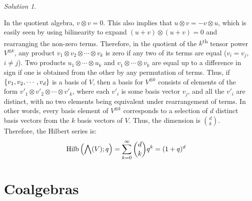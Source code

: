\documentclass[svgnames]{article}
\theoremstyle{definition}
\theoremstyle{remark}
\newtheorem*{Solution*}{Solution}
\theoremstyle{underline}
\theoremstyle{underline}
\DeclareMathOperator{\Hilb}{Hilb}
\renewcommand{\th}{\textsuperscript{th}\xspace}
\begin{document}
\begin{Solution*}
\begin{subquests}
			\item In the quotient algebra, $v \otimes v = 0$. This also implies that $u \otimes v = - v \otimes u$, which is easily seen by using bilinearity to expand $(u + v) \otimes (u + v) = 0$ and rearranging the non-zero terms. Therefore, in the quotient of the $k$\th tensor power $V^{\otimes k}$, any product $v_1 \otimes v_2 \otimes \cdots \otimes v_k$ is zero if any two of its terms are equal ($v_i = v_j$, $i \ne j$). Two products $u_1 \otimes \cdots \otimes u_k$ and $v_1 \otimes \cdots \otimes v_k$ are equal up to a difference in sign if one is obtained from the other by any permutation of terms. Thus, if $\qty{v_1, v_2, \cdots, v_d}$ is a basis of $V$, then a basis for $V^{\otimes k}$ consists of elements of the form $v'_1 \otimes v'_2 \otimes \cdots \otimes v'_k$, where each $v'_i$ is some basis vector $v_j$, and all the $v'_i$ are distinct, with no two elements being equivalent under rearrangement of terms. In other words, every basis element of $V^{\otimes k}$ corresponds to a selection of $d$ distinct basis vectors from the $k$ basis vectors of $V$. Thus, the dimension is $\binom d k$. Therefore, the Hilbert series is:
			\begin{gather*}
				\Hilb\pqty{\bigwedge(V);q} = \sum_{k=0}^{\infty} \binom d k q^k = (1 + q)^d
			\end{gather*}
 		\end{subquests}
	\end{Solution*}


	\section{Coalgebras}
\end{document}
